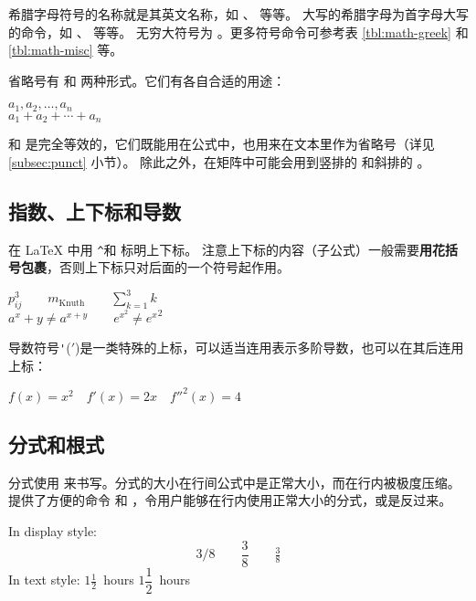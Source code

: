 希腊字母符号的名称就是其英文名称，如 、 等等。
大写的希腊字母为首字母大写的命令，如 、 等等。
无穷大符号为 。更多符号命令可参考表 \ref{tbl:math-greek} 和 \ref{tbl:math-misc} 等。

省略号有  和  两种形式。它们有各自合适的用途：
\begin{example}
$a_1, a_2, \dots, a_n$ \\
$a_1 + a_2 + \cdots + a_n$
\end{example}

 和  是完全等效的，它们既能用在公式中，也用来在文本里作为省略号（详见 \ref{subsec:punct} 小节）。
除此之外，在矩阵中可能会用到竖排的  和斜排的 。

\subsection{指数、上下标和导数}\label{subsec:math-scripts}

在 \LaTeX{} 中用 \texttt\textasciicircum 和 \texttt\textunderscore 标明上下标。
注意上下标的内容（子公式）一般需要\textbf{用花括号包裹}，否则上下标只对后面的一个符号起作用。
\begin{example}
$p^3_{ij} \qquad
m_\mathrm{Knuth}\qquad
\sum_{k=1}^3 k $\\[5pt]
$a^x+y \neq a^{x+y}\qquad
e^{x^2} \neq {e^x}^2$
\end{example}

导数符号\texttt'(${}'$)是一类特殊的上标，可以适当连用表示多阶导数，也可以在其后连用上标：
\begin{example}
$f(x) = x^2 \quad f'(x)
= 2x \quad f''^{2}(x) = 4$
\end{example}

\subsection{分式和根式}\label{subsec:frac-sqrt}

分式使用  来书写。分式的大小在行间公式中是正常大小，而在行内被极度压缩。
 提供了方便的命令  和 ，令用户能够在行内使用正常大小的分式，或是反过来。
\begin{example}
In display style:
\[
3/8 \qquad \frac{3}{8}
\qquad \tfrac{3}{8}
\]
In text style:
$1\frac{1}{2}$~hours \qquad
$1\dfrac{1}{2}$~hours
\end{example}

